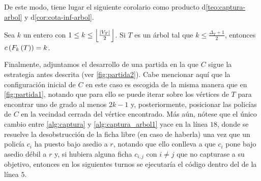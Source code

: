 De este modo, tiene lugar el siguiente corolario como producto
d\cref{teo:captura-arbol} y d\cref{cor:cota-inf-arbol}.

\begin{corolario}
    \label{cor:arbol}
        Sea $k$ un entero con $1 \le k \le
        \left\lfloor\frac{\left|V_T\right|}{2}\right\rfloor$. Si $T$ es un \'arbol tal
        que $k\leq \frac{\Delta_T + 1}{2}$, entonces $c\left( F_{k}\left( T\right)\right) = k$.
\end{corolario}

Finalmente, adjuntamos el desarrollo de una partida en la que $C$ sigue la
estrategia antes descrita (ver \cref{fig:partida2}). Cabe mencionar aqu\'i que
la configuraci\'on inicial de $C$ en este caso es escogida de la misma manera
que en \cref{fig:partida1}, notando que para ello se puede iterar sobre los
v\'ertices de $T$ para encontrar uno de grado al menos $2k-1$ y, posteriormente,
posicionar las polic\'ias de $C$ en la vecindad cerrada del v\'ertice
encontrado. M\'as a\'un, n\'otese que el \'unico cambio entre \cref{alg:captura}
y \cref{alg:captura_arbol1} yace en la l\'inea $18$, donde se resuelve la
desobstrucci\'on de la ficha libre (en caso de haberla) una vez que un polic\'ia
$c_i$ ha puesto bajo asedio a $r$, notando que ello conlleva a que $c_i$ pone
bajo asedio d\'ebil a $r$ y, si hubiera alguna ficha $c_{i,j}$ con $i\neq j$ que
no capturase a su objetivo, entonces en los siguientes turnos se ejecutar\'ia el
c\'odigo dentro del  de la l\'inea $5$.

